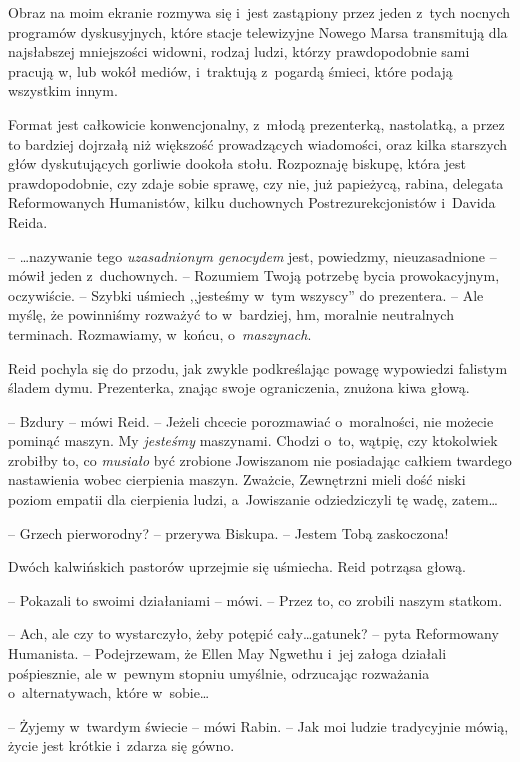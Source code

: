 \documentclass[oneside,polish,11pt,sfheadings]{mwbk}
\begin{document}
Obraz na moim ekranie rozmywa się i~jest zastąpiony przez jeden z~tych
nocnych programów dyskusyjnych, które stacje telewizyjne Nowego Marsa
transmitują dla najsłabszej mniejszości widowni, rodzaj ludzi, którzy
prawdopodobnie sami pracują w, lub wokół mediów, i~traktują z~pogardą
śmieci, które podają wszystkim innym.

Format jest całkowicie konwencjonalny, z~młodą prezenterką, nastolatką,
a przez to bardziej dojrzałą niż większość prowadzących wiadomości, oraz
kilka starszych głów dyskutujących gorliwie dookoła stołu. Rozpoznaję
biskupę, która jest prawdopodobnie, czy zdaje sobie sprawę, czy nie, już
papieżycą, rabina, delegata Reformowanych Humanistów, kilku duchownych
Postrezurekcjonistów i~Davida Reida.

-- \ldots  nazywanie tego \textit{uzasadnionym genocydem} jest, powiedzmy,
nieuzasadnione -- mówił jeden z~duchownych. -- Rozumiem Twoją potrzebę
bycia prowokacyjnym, oczywiście. -- Szybki uśmiech ,,jesteśmy w~tym
wszyscy'' do prezentera. -- Ale myślę, że powinniśmy rozważyć to w~bardziej, hm, moralnie neutralnych terminach. Rozmawiamy, w~końcu, o~\textit{maszynach}.

Reid pochyla się do przodu, jak zwykle podkreślając powagę wypowiedzi
falistym śladem dymu. Prezenterka, znając swoje ograniczenia, znużona
kiwa głową.

-- Bzdury -- mówi Reid. -- Jeżeli chcecie porozmawiać o~moralności, nie
możecie pominąć maszyn. My \textit{jesteśmy} maszynami. Chodzi o~to,
wątpię, czy ktokolwiek zrobiłby to, co \textit{musiało} być zrobione
Jowiszanom nie posiadając całkiem twardego nastawienia wobec cierpienia
maszyn. Zważcie, Zewnętrzni mieli dość niski poziom empatii dla
cierpienia ludzi, a~Jowiszanie odziedziczyli tę wadę, zatem\ldots 

-- Grzech pierworodny? -- przerywa Biskupa. -- Jestem Tobą zaskoczona!

Dwóch kalwińskich pastorów uprzejmie się uśmiecha. Reid potrząsa głową.

-- Pokazali to swoimi działaniami -- mówi. -- Przez to, co zrobili naszym
statkom.

-- Ach, ale czy to wystarczyło, żeby potępić cały\ldots  gatunek? -- pyta
Reformowany Humanista. -- Podejrzewam, że Ellen May Ngwethu i~jej załoga
działali pośpiesznie, ale w~pewnym stopniu umyślnie, odrzucając
rozważania o~alternatywach, które w~sobie\ldots 

-- Żyjemy w~twardym świecie -- mówi Rabin. -- Jak moi ludzie tradycyjnie
mówią, życie jest krótkie i~zdarza się gówno.
\end{document}
